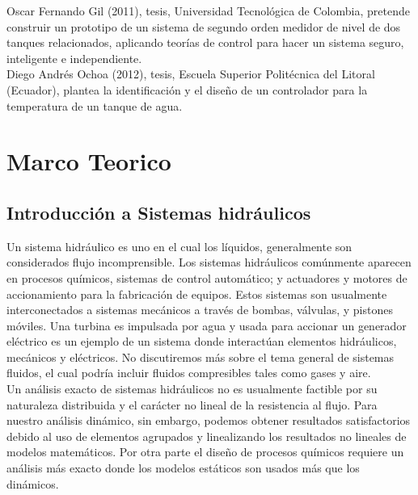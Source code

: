 \documentclass[a4paper,12pt,twoside]{proyectotanquesecci}
\begin{document}
Oscar Fernando Gil (2011), tesis, Universidad Tecnológica de Colombia, pretende construir un prototipo de un sistema de segundo orden medidor de nivel de dos tanques relacionados, aplicando teorías de control para hacer un sistema seguro, inteligente e independiente.\\

Diego Andrés Ochoa (2012), tesis, Escuela Superior Politécnica del Litoral (Ecuador), plantea la identificación y el diseño de un controlador para la temperatura de un tanque de agua.\\









\chapter{Marco Teorico}

\section{Introducción a Sistemas hidráulicos}

Un sistema hidráulico es uno en el cual los líquidos, generalmente son considerados flujo incomprensible. Los sistemas hidráulicos comúnmente aparecen en procesos químicos, sistemas de control automático; y actuadores y motores de accionamiento para la fabricación de equipos. Estos sistemas son usualmente interconectados a sistemas mecánicos a través de bombas, válvulas, y pistones móviles. Una turbina es impulsada por agua y usada para accionar un generador eléctrico es un ejemplo de un sistema donde interactúan elementos hidráulicos, mecánicos y eléctricos. No discutiremos más sobre el tema general de sistemas fluidos, el cual podría incluir fluidos compresibles tales como gases y aire. \\

Un análisis exacto de sistemas hidráulicos no es usualmente factible por su naturaleza distribuida y el carácter no lineal de la resistencia al flujo. Para nuestro análisis dinámico, sin embargo, podemos obtener resultados satisfactorios debido al uso de elementos agrupados y linealizando los resultados no lineales de modelos matemáticos. Por otra parte el diseño de procesos químicos requiere un análisis más exacto donde los modelos estáticos son usados más que los dinámicos.\\
\end{document}
